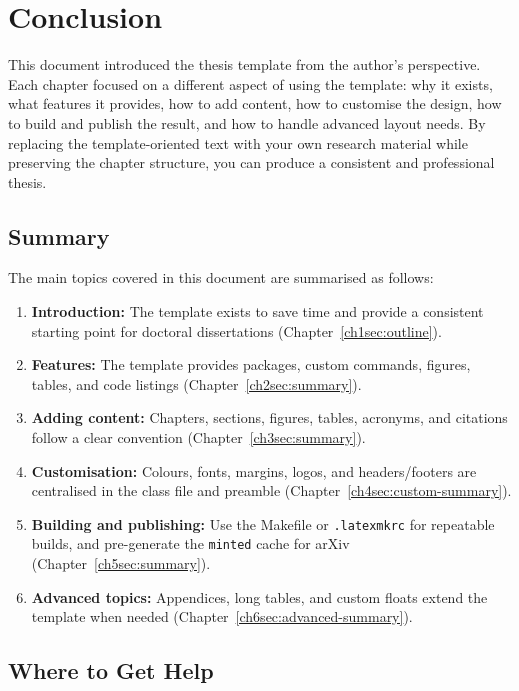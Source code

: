 \chapter{Conclusion}
\glsresetall

This document introduced the thesis template from the author's perspective. Each chapter focused on a different aspect of using the template: why it exists, what features it provides, how to add content, how to customise the design, how to build and publish the result, and how to handle advanced layout needs. By replacing the template-oriented text with your own research material while preserving the chapter structure, you can produce a consistent and professional thesis.

\section{Summary}

The main topics covered in this document are summarised as follows:

\begin{enumerate}
\item \textbf{Introduction:} The template exists to save time and provide a consistent starting point for doctoral dissertations (Chapter~\ref{ch1sec:outline}).
\item \textbf{Features:} The template provides packages, custom commands, figures, tables, and code listings (Chapter~\ref{ch2sec:summary}).
\item \textbf{Adding content:} Chapters, sections, figures, tables, acronyms, and citations follow a clear convention (Chapter~\ref{ch3sec:summary}).
\item \textbf{Customisation:} Colours, fonts, margins, logos, and headers/footers are centralised in the class file and preamble (Chapter~\ref{ch4sec:custom-summary}).
\item \textbf{Building and publishing:} Use the Makefile or \texttt{.latexmkrc} for repeatable builds, and pre-generate the \texttt{minted} cache for arXiv (Chapter~\ref{ch5sec:summary}).
\item \textbf{Advanced topics:} Appendices, long tables, and custom floats extend the template when needed (Chapter~\ref{ch6sec:advanced-summary}).
\end{enumerate}

\section{Where to Get Help}

